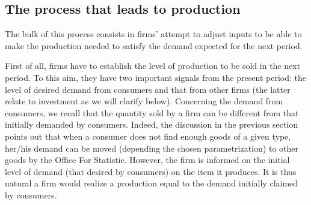 \documentclass{book}
\begin{document}
\subsection{The process that leads to production}

The bulk of this process consists in firms' attempt to adjust inputs to be able to make the production needed to satisfy the demand expected for the next period.

First of all, firms have to establish the level of production to be sold in the next period. To this aim, they have two important signals from the present period: the level of desired demand from consumers and that from other firms (the latter relate to investment as we will clarify below).
Concerning the demand from consumers, we recall that the quantity sold by a firm can be different from that initially demanded by consumers. Indeed, the discussion in the previous section points out that when a consumer does not find enough goods of a given type, her/his demand can be moved (depending the chosen parametrization) to other goods by the Office For Statistic. However, the firm is informed on the initial level of demand (that desired by consumers) on the item it produces. It is thus natural a firm would realize a production equal to the demand initially claimed by consumers.  

\end{document}
